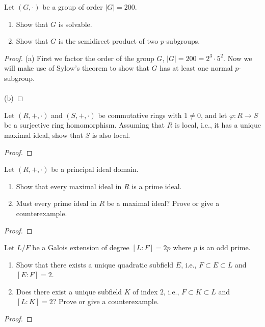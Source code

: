 \begin{problem}
Let $(G,\cdot)$ be a group of order $|G|=200$.
\begin{enumerate}[noitemsep,label=(\alph*)]
\item Show that $G$ is solvable.
\item Show that $G$ is the semidirect product of two $p$-subgroups.
\end{enumerate}
\end{problem}
\begin{proof}
(a) First we factor the order of the group $G$, $|G|=200=2^3\cdot
5^2$. Now we will make use of Sylow's theorem to show that $G$ has at least
one normal $p$-subgroup.
\\\\
(b)
\end{proof}
\begin{problem}
Let $(R,+,\cdot)$ and $(S,+,\cdot)$ be commutative rings with $1\neq 0$,
and let $\varphi\colon R\to S$ be a surjective ring homomorphism. Assuming
that $R$ is local, i.e., it has a unique maximal ideal, show that $S$ is
also local.
\end{problem}
\begin{proof}
\end{proof}
\begin{problem}
Let $(R,+,\cdot)$ be a principal ideal domain.
\begin{enumerate}[noitemsep,label=(\alph*)]
\item Show that every maximal ideal in $R$ is a prime ideal.
\item Must every prime ideal in $R$ be a maximal ideal? Prove or give a
  counterexample.
\end{enumerate}
\end{problem}
\begin{proof}
\end{proof}
\begin{problem}
Let $L/F$ be a Galois extension of degree $[L:F]=2p$ where $p$ is an odd
prime.
\begin{enumerate}[noitemsep,label=(\alph*)]
\item Show that there exists a unique quadratic subfield $E$, i.e.,
  $F\subset E\subset L$ and $[E:F]=2$.
\item Does there exist a unique subfield $K$ of index $2$, i.e., $F\subset
  K\subset L$ and $[L:K]=2$? Prove or give a counterexample.
\end{enumerate}
\end{problem}
\begin{proof}
\end{proof}
